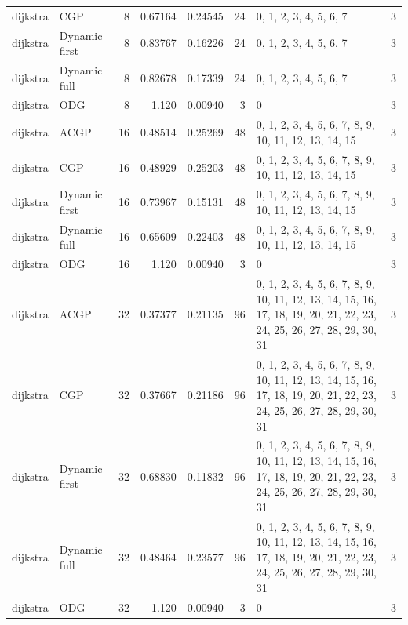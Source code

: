 \documentclass[10pt,a4paper]{article}
\begin{document}
\begin{longtable}{@{}p{23mm}p{29mm}rrrrp{36mm}r@{}}
dijkstra & CGP & 8 & 0.67164 & 0.24545 & 24 & 0, 1, 2, 3, 4, 5, 6, 7 & 3 \\
dijkstra & Dynamic first & 8 & 0.83767 & 0.16226 & 24 & 0, 1, 2, 3, 4, 5, 6, 7 & 3 \\
dijkstra & Dynamic full & 8 & 0.82678 & 0.17339 & 24 & 0, 1, 2, 3, 4, 5, 6, 7 & 3 \\
dijkstra & ODG & 8 & 1.120 & 0.00940 & 3 & 0 & 3 \\
dijkstra & ACGP & 16 & 0.48514 & 0.25269 & 48 & 0, 1, 2, 3, 4, 5, 6, 7, 8, 9, 10, 11, 12, 13, 14, 15 & 3 \\
dijkstra & CGP & 16 & 0.48929 & 0.25203 & 48 & 0, 1, 2, 3, 4, 5, 6, 7, 8, 9, 10, 11, 12, 13, 14, 15 & 3 \\
dijkstra & Dynamic first & 16 & 0.73967 & 0.15131 & 48 & 0, 1, 2, 3, 4, 5, 6, 7, 8, 9, 10, 11, 12, 13, 14, 15 & 3 \\
dijkstra & Dynamic full & 16 & 0.65609 & 0.22403 & 48 & 0, 1, 2, 3, 4, 5, 6, 7, 8, 9, 10, 11, 12, 13, 14, 15 & 3 \\
dijkstra & ODG & 16 & 1.120 & 0.00940 & 3 & 0 & 3 \\
dijkstra & ACGP & 32 & 0.37377 & 0.21135 & 96 & 0, 1, 2, 3, 4, 5, 6, 7, 8, 9, 10, 11, 12, 13, 14, 15, 16, 17, 18, 19, 20, 21, 22, 23, 24, 25, 26, 27, 28, 29, 30, 31 & 3 \\
dijkstra & CGP & 32 & 0.37667 & 0.21186 & 96 & 0, 1, 2, 3, 4, 5, 6, 7, 8, 9, 10, 11, 12, 13, 14, 15, 16, 17, 18, 19, 20, 21, 22, 23, 24, 25, 26, 27, 28, 29, 30, 31 & 3 \\
dijkstra & Dynamic first & 32 & 0.68830 & 0.11832 & 96 & 0, 1, 2, 3, 4, 5, 6, 7, 8, 9, 10, 11, 12, 13, 14, 15, 16, 17, 18, 19, 20, 21, 22, 23, 24, 25, 26, 27, 28, 29, 30, 31 & 3 \\
dijkstra & Dynamic full & 32 & 0.48464 & 0.23577 & 96 & 0, 1, 2, 3, 4, 5, 6, 7, 8, 9, 10, 11, 12, 13, 14, 15, 16, 17, 18, 19, 20, 21, 22, 23, 24, 25, 26, 27, 28, 29, 30, 31 & 3 \\
dijkstra & ODG & 32 & 1.120 & 0.00940 & 3 & 0 & 3 \\
\end{longtable}\normalsize\setlength{\tabcolsep}{6pt}
\clearpage
\end{document}

